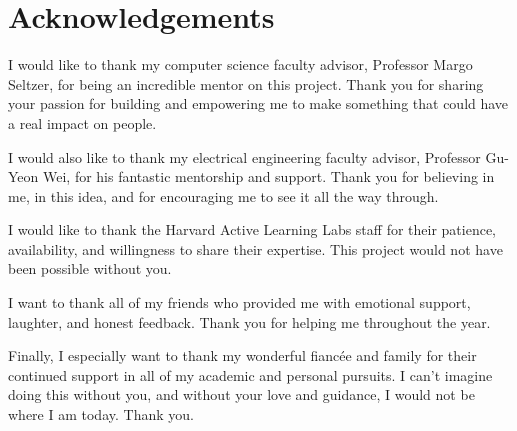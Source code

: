 \section*{Acknowledgements}

\onehalfspacing

I would like to thank my computer science faculty advisor, Professor Margo Seltzer, for being an incredible mentor on this project.  Thank you for sharing your passion for building and empowering me to make something that could have a real impact on people.

I would also like to thank my electrical engineering faculty advisor, Professor Gu-Yeon Wei, for his fantastic mentorship and support. Thank you for believing in me, in this idea, and for encouraging me to see it all the way through.

I would like to thank the Harvard Active Learning Labs staff for their patience, availability, and willingness to share their expertise. This project would not have been possible without you.

I want to thank all of my friends who provided me with emotional support, laughter, and honest feedback. Thank you for helping me throughout the year.

Finally, I especially want to thank my wonderful fiancée and family for their continued support in all of my academic and personal pursuits. I can't imagine doing this without you, and without your love and guidance, I would not be where I am today. Thank you.
